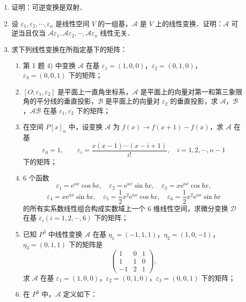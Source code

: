 \begin{enumerate}
  \[
    \mathcal{A}^k\mathcal{B}-\mathcal{B}\mathcal{A}^k=k\mathcal{A}^{k-1},\qquad k>1.
  \]
  \ansproof
  \item 证明：可逆变换是双射．
  \ansproof
  \item 设 $\varepsilon_1,\varepsilon_2,\cdots,\varepsilon_n$ 是线性空间 $V$ 的一组基，$\mathcal{A}$ 是 $V$ 上的线性变换．证明：$\mathcal{A}$ 可逆当且仅当 $\mathcal{A}\varepsilon_1,\mathcal{A}\varepsilon_2,\cdots,\mathcal{A}\varepsilon_n$ 线性无关．
  \ansproof
  \item 求下列线性变换在所指定基下的矩阵：
  \begin{enumerate}
    \item 第 1 题 4) 中变换 $\mathcal{A}$ 在基 $\varepsilon_1=(1,0,0)$，$\varepsilon_2=(0,1,0)$，$\varepsilon_3=(0,0,1)$ 下的矩阵；
  \anssub
    \item $[O;\varepsilon_1,\varepsilon_2]$ 是平面上一直角坐标系，$\mathcal{A}$ 是平面上的向量对第一和第三象限角的平分线的垂直投影，$\mathcal{B}$ 是平面上的向量对 $\varepsilon_2$ 的垂直投影，求 $\mathcal{A}$，$\mathcal{B}$，$\mathcal{A}\mathcal{B}$ 在基 $\varepsilon_1,\varepsilon_2$ 下的矩阵；
  \anssub
    \item 在空间 $P[x]_n$ 中，设变换 $\mathcal{A}$ 为 $f(x)\to f(x+1)-f(x)$，求 $\mathcal{A}$ 在基
    \[
      \varepsilon_0=1,\qquad
      \varepsilon_i=\frac{x(x-1)\cdots(x-i+1)}{i!},\quad i=1,2,\cdots,n-1
    \]
    下的矩阵；
  \anssub
    \item 6 个函数
    \[
      \varepsilon_1=\mathrm{e}^{ax}\cos bx,\quad
      \varepsilon_2=\mathrm{e}^{ax}\sin bx,\quad
      \varepsilon_3=x\mathrm{e}^{ax}\cos bx,
    \]
    \[
      \varepsilon_4=x\mathrm{e}^{ax}\sin bx,\quad
      \varepsilon_5=\frac{1}{2}x^2\mathrm{e}^{ax}\cos bx,\quad
      \varepsilon_6=\frac{1}{2}x^2\mathrm{e}^{ax}\sin bx
    \]
    的所有实系数线性组合构成实数域上一个 6 维线性空间，求微分变换 $\mathcal{D}$ 在基 $\varepsilon_i(i=1,2,\cdots,6)$ 下的矩阵；
  \anssub
    \item 已知 $P^3$ 中线性变换 $\mathcal{A}$ 在基 $\eta_1=(-1,1,1)$，$\eta_2=(1,0,-1)$，$\eta_3=(0,1,1)$ 下的矩阵是
    \[
      \begin{pmatrix}
        1&0&1\\
        1&1&0\\
        -1&2&1
      \end{pmatrix},
    \]
    求 $\mathcal{A}$ 在基 $\varepsilon_1=(1,0,0)$，$\varepsilon_2=(0,1,0)$，$\varepsilon_3=(0,0,1)$ 下的矩阵；
  \anssub
    \item 在 $P^3$ 中，$\mathcal{A}$ 定义如下：

\end{enumerate}
\end{enumerate}
